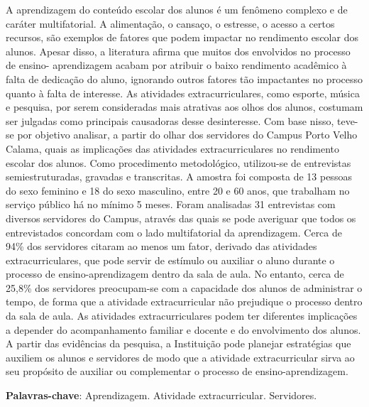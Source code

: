 \documentclass[article,12pt,onesidea,4paper,english,brazil]{abntex2}
\begin{document}
	\noindent A aprendizagem do conteúdo escolar dos alunos é um fenômeno complexo e de
	caráter multifatorial. A alimentação, o cansaço, o estresse, o acesso a certos recursos,
	são exemplos de fatores que podem impactar no rendimento escolar dos alunos.	
	Apesar disso, a literatura afirma que muitos dos envolvidos no processo de ensino-
	aprendizagem acabam por atribuir o baixo rendimento acadêmico à falta de dedicação	
	do aluno, ignorando outros fatores tão impactantes no processo quanto à falta de
	interesse. As atividades extracurriculares, como esporte, música e pesquisa, por
	serem consideradas mais atrativas aos olhos dos alunos, costumam ser julgadas
	como principais causadoras desse desinteresse. Com base nisso, teve-se por objetivo
	analisar, a partir do olhar dos servidores do Campus Porto Velho Calama, quais as
	implicações das atividades extracurriculares no rendimento escolar dos alunos. Como
	procedimento metodológico, utilizou-se de entrevistas semiestruturadas, gravadas e
	transcritas. A amostra foi composta de 13 pessoas do sexo feminino e 18 do sexo
	masculino, entre 20 e 60 anos, que trabalham no serviço público há no mínimo 5
	meses. Foram analisadas 31 entrevistas com diversos servidores do Campus, através
	das quais se pode averiguar que todos os entrevistados concordam com o lado
	multifatorial da aprendizagem. Cerca de 94\% dos servidores citaram ao menos um
	fator, derivado das atividades extracurriculares, que pode servir de estímulo ou auxiliar
	o aluno durante o processo de ensino-aprendizagem dentro da sala de aula. No
	entanto, cerca de 25,8\% dos servidores preocupam-se com a capacidade dos alunos
	de administrar o tempo, de forma que a atividade extracurricular não prejudique o
	processo dentro da sala de aula. As atividades extracurriculares podem ter diferentes
	implicações a depender do acompanhamento familiar e docente e do envolvimento
	dos alunos. A partir das evidências da pesquisa, a Instituição pode planejar estratégias
	que auxiliem os alunos e servidores de modo que a atividade extracurricular sirva ao
	seu propósito de auxiliar ou complementar o processo de ensino-aprendizagem.
	
	\vspace{\onelineskip}
	
	\noindent
	\textbf{Palavras-chave}: Aprendizagem. Atividade extracurricular. Servidores.
	
\end{document}
